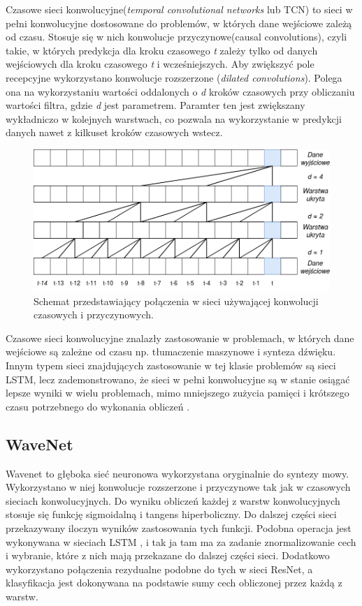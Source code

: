 \documentclass[a4paper,11pt,twoside]{report}
\theoremstyle{definition}
\begin{document}
Czasowe sieci konwolucyjne(\textit{temporal convolutional networks} lub TCN) to sieci w pełni konwolucyjne dostosowane do problemów, w których dane wejściowe zależą od czasu. Stosuje się w nich konwolucje przyczynowe(causal convolutions), czyli takie, w których predykcja dla kroku czasowego \textit{t} zależy tylko od danych wejściowych dla kroku czasowego \textit{t} i wcześniejszych. Aby zwiększyć pole recepcyjne wykorzystano konwolucje rozszerzone (\textit{dilated convolutions}). Polega ona na wykorzystaniu wartości oddalonych o \textit{d} kroków czasowych przy obliczaniu wartości filtra, gdzie \textit{d} jest parametrem. Paramter ten jest zwiększany wykładniczo w kolejnych warstwach, co pozwala na wykorzystanie w predykcji danych nawet z kilkuset kroków czasowych wstecz.

\begin{figure}[h!]
	\centering
	\includegraphics[scale=0.5]{tcn}
	\caption{Schemat przedstawiający połączenia w sieci używającej konwolucji czasowych i przyczynowych.}
\end{figure}

Czasowe sieci konwolucyjne znalazły zastosowanie w problemach, w których dane wejściowe są zależne od czasu np. tłumaczenie maszynowe\cite{fcnTranslation} i synteza dźwięku. Innym typem sieci znajdujących zastosowanie w tej klasie problemów są sieci LSTM\cite{lstm}, lecz zademonstrowano, że sieci w pełni konwolucyjne są w stanie osiągać lepsze wyniki w wielu problemach, mimo mniejszego zużycia pamięci i krótszego czasu potrzebnego do wykonania obliczeń \cite{sequenceModelling}.

\subsection{WaveNet}

Wavenet to głęboka sieć neuronowa wykorzystana oryginalnie do syntezy mowy\cite{wavenet}. Wykorzystano w niej konwolucje rozszerzone i przyczynowe tak jak w czasowych sieciach konwolucyjnych. Do wyniku obliczeń każdej z warstw konwolucyjnych stosuje się funkcję sigmoidalną i tangens hiperboliczny. Do dalszej części sieci przekazywany iloczyn wyników zastosowania tych funkcji. Podobna operacja jest wykonywana w sieciach LSTM \cite{lstm}, i tak ja tam ma za zadanie znormalizowanie cech i wybranie, które z nich mają przekazane do dalszej części sieci. Dodatkowo wykorzystano połączenia rezydualne podobne do tych w sieci ResNet\cite{resnet}, a klasyfikacja jest dokonywana na podstawie sumy cech obliczonej przez każdą z warstw.
\end{document}
